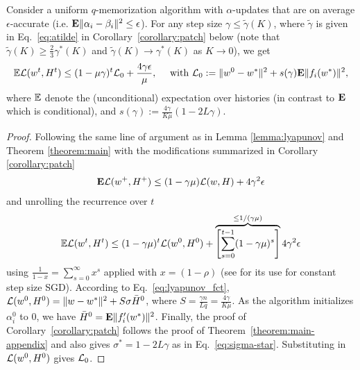 \begin{theorem}
\label{theorem:approximate-appendix}
Consider a uniform $q$-memorization algorithm with $\alpha$-updates that are on average $\epsilon$-accurate (i.e. ${\mathbf E}\| \alpha_i - \beta_i \|^2 \le \epsilon$). For any step size $\gamma \le \tilde{\gamma}(K)$, where $\tilde{\gamma}$ is given in Eq.~\eqref{eq:atilde} in Corollary~\ref{corollary:patch} below (note that $\tilde{\gamma}(K) \geq \frac{2}{3} \gamma^*(K)$ and $\tilde{\gamma}(K) \to \gamma^*(K)$ as $K \to 0$), we get 
\begin{align}
\mathbb{E} {\mathcal L}(w^t,H^t) \le  (1-\mu \gamma)^t  {\mathcal L}_0+ \frac{4 \gamma \epsilon}{\mu}, \quad \text{ with } {\mathcal L}_0 := \|w^0 - w^*\|^2 + s(\gamma) {\mathbf E} \|f_i(w^*)\|^2 ,
\end{align}
where $\mathbb{E}$ denote the (unconditional) expectation over histories (in contrast to ${\mathbf E}$ which is conditional), and $ s(\gamma) := \frac{4 \gamma}{K \mu} (1-2 L \gamma)$.
\begin{proof} Following the same line of argument as in Lemma \ref{lemma:lyapunov} and Theorem \ref{theorem:main} with the modifications summarized in Corollary \ref{corollary:patch}
\begin{align*}
{\mathbf E} {\mathcal L}(w^+,H^+) \le  (1-\gamma\mu)  {\mathcal L}(w,H) + 4 \gamma^2 \epsilon
\end{align*}
and unrolling the recurrence over $t$ \vspace*{-5mm}
\begin{align*} 
    \mathbb{E} {\mathcal L}(w^t,H^t) \le  (1-\gamma\mu)^t  {\mathcal L}(w^0,H^0) + \overbrace{\left[ \sum_{s=0}^{t-1} (1- \gamma\mu)^s\right]}^{\leq 1/(\gamma \mu)} 4 \gamma^2 \epsilon
\end{align*}
using $\frac{1}{1-x} = \sum_{s=0}^\infty x^s$ applied with $x=(1-\rho)$ (see \cite{schmidt2014convergence} for its use for constant step size SGD). According to Eq.~\eqref{eq:lyapunov_fct}, ${\mathcal L}(w^0, H^0) = \|w-w^*\|^2 + S \sigma \bar{H}^0$, where $S = \frac{\gamma n}{L q} = \frac{4 \gamma}{K \mu}$. As the algorithm initializes $\alpha_i^0$ to $0$, we have $\bar{H}^0 = {\mathbf E} \|f'_i(w^*)\|^2$. Finally, the proof of Corollary~\ref{corollary:patch} follows the proof of Theorem~\ref{theorem:main-appendix} and also gives $\sigma^* = 1-2 L \gamma$ as in Eq.~\eqref{eq:sigma-star}. Substituting in ${\mathcal L}(w^0, H^0)$ gives ${\mathcal L}_0$.
\end{proof}
\end{theorem} 

